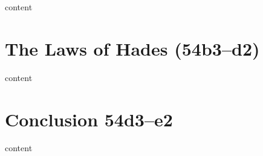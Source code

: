 \documentclass[11pt]{article}
\begin{document}
content

\section{The Laws of Hades (54b3--d2)}

content

\section{Conclusion 54d3--e2}

content

\newpage


\end{document}
